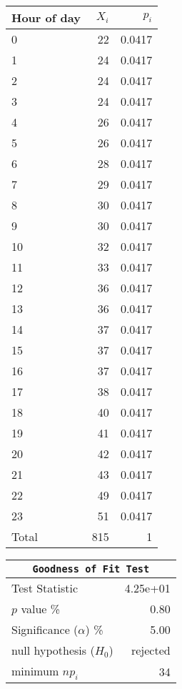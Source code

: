 \begin{enumerate}
	\begin{table}[H]
		\centering
		\begin{minipage}{0.4\textwidth}
			\centering
			\begin{tabular}{@{}lrr@{}}
				\toprule
				Hour of day & $X_i$ &   $p_i$ \\
				\midrule
				0     &    22 &  0.0417 \\
				1     &    24 &  0.0417 \\
				2     &    24 &  0.0417 \\
				3     &    24 &  0.0417 \\
				4     &    26 &  0.0417 \\
				5     &    26 &  0.0417 \\
				6     &    28 &  0.0417 \\
				7     &    29 &  0.0417 \\
				8     &    30 &  0.0417 \\
				9     &    30 &  0.0417 \\
				10    &    32 &  0.0417 \\
				11    &    33 &  0.0417 \\
				12    &    36 &  0.0417 \\
				13    &    36 &  0.0417 \\
				14    &    37 &  0.0417 \\
				15    &    37 &  0.0417 \\
				16    &    37 &  0.0417 \\
				17    &    38 &  0.0417 \\
				18    &    40 &  0.0417 \\
				19    &    41 &  0.0417 \\
				20    &    42 &  0.0417 \\
				21    &    43 &  0.0417 \\
				22    &    49 &  0.0417 \\
				23    &    51 &  0.0417 \\
				\midrule
				Total &   815 &       1 \\
				\bottomrule
			\end{tabular}
			
		\end{minipage}
		\begin{minipage}{0.4\textwidth}
			\centering
			\begin{tabular}{@{}lr@{}}
				\toprule
				\multicolumn{2}{c}{\texttt{Goodness of Fit Test}} \\
				\midrule
				Test Statistic             &  4.25e+01 \\
				$p$ value \%               &      0.80 \\
				Significance ($\alpha$) \% &      5.00 \\
				null hypothesis ($H_0$)    &  rejected \\
				minimum $n p_i$            &        34 \\
				\bottomrule
			\end{tabular}
			

\end{minipage}
\end{table}
\end{enumerate}
